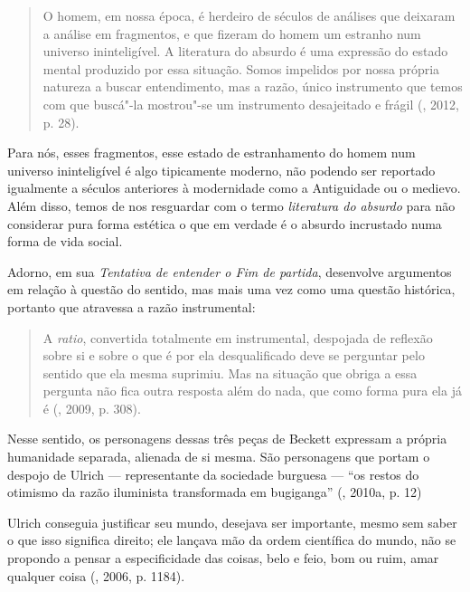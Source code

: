 \begin{quote}
O homem, em nossa época, é herdeiro de séculos de análises que deixaram
a análise em fragmentos, e que fizeram do homem um estranho num universo
ininteligível. A literatura do absurdo é uma expressão do estado mental
produzido por essa situação. Somos impelidos por nossa própria natureza
a buscar entendimento, mas a razão, único instrumento que temos com que
buscá"-la mostrou"-se um instrumento desajeitado e frágil (, 2012, p. 28).
\end{quote}

Para nós, esses fragmentos, esse estado de estranhamento do homem num
universo ininteligível é algo tipicamente moderno, não podendo ser
reportado igualmente a séculos anteriores à modernidade como a
Antiguidade ou o medievo. Além disso, temos de nos resguardar com o
termo \emph{literatura do absurdo} para não considerar pura forma
estética o que em verdade é o absurdo incrustado numa forma de vida
social.

Adorno, em sua \emph{Tentativa de entender o Fim de partida}, desenvolve
argumentos em relação à questão do sentido, mas mais uma vez como uma
questão histórica, portanto que atravessa a razão instrumental:

\begin{quote}
A \emph{ratio}, convertida totalmente em instrumental, despojada de
reflexão sobre si e sobre o que é por ela desqualificado deve se
perguntar pelo sentido que ela mesma suprimiu. Mas na situação que
obriga a essa pergunta não fica outra resposta além do nada, que como
forma pura ela já é (, 2009, p. 308).
\end{quote}

Nesse sentido, os personagens dessas três peças de Beckett expressam a
própria humanidade separada, alienada de si mesma. São personagens que
portam o despojo de Ulrich --- representante da sociedade burguesa ---
``os restos do otimismo da razão iluminista transformada em bugiganga''
(, 2010a, p. 12)

Ulrich conseguia justificar seu mundo, desejava ser importante, mesmo
sem saber o que isso significa direito; ele lançava mão da ordem
científica do mundo, não se propondo a pensar a especificidade das
coisas, belo e feio, bom ou ruim, amar qualquer coisa (, 2006, p.
1184).

